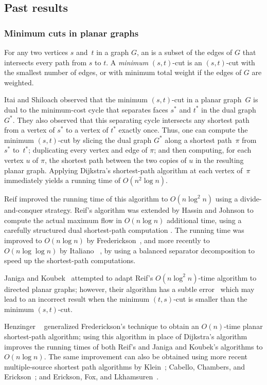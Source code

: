 \documentclass[letterpaper,review]{siamart190516}
\begin{document}
\subsection{Past results}

\subsubsection*{Minimum cuts in planar graphs}

For any two vertices $s$ and~$t$ in a graph $G$, an  is a subset of the edges of $G$ that intersects every path from $s$ to $t$.  A \emph{minimum} $(s,t)$-cut is an $(s,t)$-cut with the smallest number of edges, or with minimum total weight if the edges of $G$ are weighted.

Itai and Shiloach \cite{is-mfpn-79} observed that the minimum $(s,t)$-cut in a planar graph~$G$ is dual to the minimum-cost cycle that separates faces $s^*$ and $t^*$ in the dual graph $G^*$.  They also observed that this separating cycle intersects any shortest path from a vertex of $s^*$ to a vertex of $t^*$ exactly once.  Thus, one can compute the minimum $(s,t)$-cut by slicing the dual graph $G^*$ along a shortest path~$\pi$ from $s^*$ to~$t^*$; duplicating every vertex and edge of $\pi$; and then computing, for each vertex $u$ of $\pi$, the shortest path between the two copies of $u$ in the resulting planar graph.  Applying Dijkstra's shortest-path algorithm at each vertex of~$\pi$ immediately yields a running time of $O(n^2\log n)$.

Reif \cite{r-mstcp-83} improved the running time of this algorithm to $O(n\log^2 n)$ using a divide-and-conquer strategy.  Reif's algorithm was extended by Hassin and Johnson to compute the actual maximum flow in $O(n\log n)$ additional time, using a carefully structured dual shortest-path computation \cite{hj-oamfu-85}.  The running time was improved to $O(n\log n)$ by Frederickson~\cite{f-faspp-87}, and more recently to $O(n\log\log n)$ by Italiano \etal~\cite{insw-iamcmf-11}, by using a balanced separator decomposition to speed up the shortest-path computations.

Janiga and Koubek~\cite{jk-mcdpn-92} attempted to adapt Reif's $O(n\log^2 n)$-time algorithm to directed planar graphs; however, their  algorithm has a subtle error~\cite{kn-mcupg-11} which may lead to an incorrect result when the minimum $(t,s)$-cut is smaller than the minimum $(s,t)$-cut.

Henzinger \etal~\cite{hkrs-fspap-97} generalized Frederickson's technique to obtain an $O(n)$-time
planar shortest-path algorithm; using this algorithm in place of Dijkstra's algorithm improves the
running times of both Reif's and Janiga and Koubek's algorithms to $O(n\log n)$.  The same
improvement can also be obtained using more recent multiple-source shortest path algorithms by
Klein~\cite{k-msspp-05}; Cabello, Chambers, and Erickson~\cite{cce-msspe-13}; and Erickson, Fox, and
Lkhamsuren~\cite{efl-hmcpf-18}.
\end{document}
